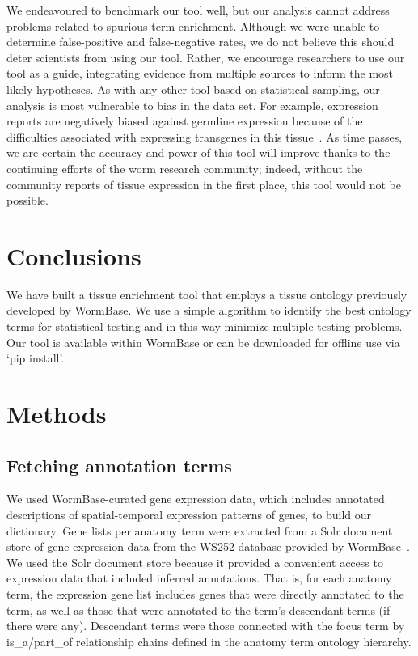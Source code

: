 We endeavoured to benchmark our tool well, but our analysis cannot address
problems related to spurious term enrichment. Although we were unable to
determine false-positive and false-negative rates, we do not believe this should
deter scientists from using our tool. Rather, we encourage researchers to use our
tool as a guide, integrating evidence from multiple sources to inform the most
likely hypotheses. As with any other tool based on statistical sampling, our
analysis is most vulnerable to bias in the data set. For example, expression
reports are negatively biased against germline expression because of the
difficulties associated with expressing transgenes in this
tissue~\cite{Kelly1997}. As time passes, we are certain the accuracy and power
of this tool will improve thanks to the continuing efforts of the  worm research
community; indeed, without the community reports of tissue expression in the
first place, this tool would not be possible.

\section*{Conclusions}

We have built a tissue enrichment tool that employs a tissue ontology previously
developed by WormBase. We use a simple algorithm to identify the best ontology
terms for statistical testing and in this way minimize multiple testing problems.
Our tool is available within WormBase or can be downloaded for offline use via
`pip install'.

\section*{Methods}
\subsection*{Fetching annotation terms}
We used WormBase-curated gene expression data, which includes annotated
descriptions of spatial-temporal expression patterns of genes, to build our
dictionary. Gene lists per anatomy term were extracted from a Solr document
store of gene expression data from the WS252 database provided by
WormBase~\cite{Howe2016}. We used the Solr document store because it provided a
convenient access to expression data that included inferred annotations. That
is, for each anatomy term, the expression gene list includes genes that were
directly annotated to the term, as well as those that were annotated to the
term's descendant terms (if there were any). Descendant terms were those
connected with the focus term by is\_a/part\_of relationship chains defined in
the anatomy term ontology hierarchy.

